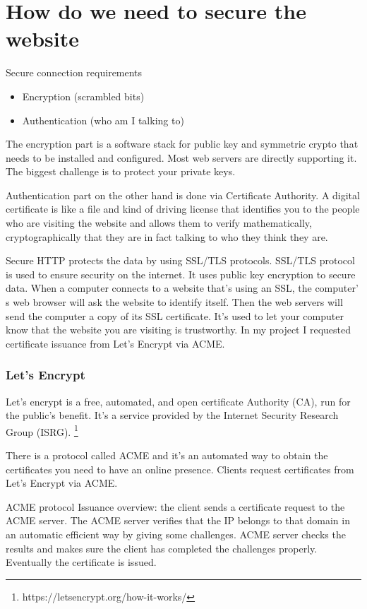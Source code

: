 \section{How do we need to secure the website}
 Secure connection requirements 
 \begin{itemize}
     
 
\item 	Encryption (scrambled bits)
\item 	Authentication (who am I talking to)
\end{itemize}

The encryption part is a software stack for public key and symmetric crypto that needs to be installed and configured. Most web servers are directly supporting it. The biggest challenge is to protect your private keys.   

Authentication part on the other hand is done via Certificate Authority. A digital certificate is like a file and kind of driving license that identifies you to the people who are visiting the website and allows them to  verify mathematically, cryptographically that  they are in fact talking to  who they think they are. 


Secure HTTP protects the data by using SSL/TLS protocols. SSL/TLS protocol is used to ensure security on the internet. It uses public key encryption to secure data. When a computer connects to a website that’s using an SSL, the computer’ s web browser will ask the website to identify itself. Then the web servers will send the computer a copy of its SSL certificate. It’s used to let your computer know that the website you are visiting is trustworthy. In my project I requested certificate issuance from Let’s Encrypt via ACME. 

\subsubsection{Let’s Encrypt}

Let’s encrypt is a free, automated, and open certificate Authority (CA), run for the public’s benefit. It’s a service provided by the Internet Security Research Group (ISRG). \footnote{https://letsencrypt.org/how-it-works/}


There is a protocol called ACME and it’s an automated way to obtain the certificates you need to have an online presence. Clients request certificates from Let’s Encrypt via ACME. 

ACME protocol Issuance overview: the client sends a certificate request to the ACME server. The ACME server verifies that the IP belongs to that domain in an automatic efficient way by giving some challenges. ACME server checks the results and makes sure the client has completed the challenges properly. Eventually the certificate is issued. 


